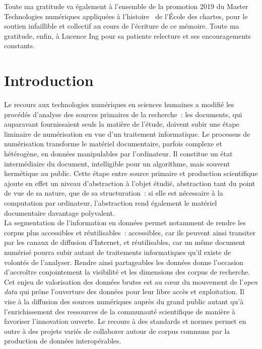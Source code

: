 \documentclass[a4paper,12pt,twoside]{book}
\newcommand{\clearemptydoublepage}{\newpage{\pagestyle{empty}\cleardoublepage}}
\newcommand\mychapter[1]{%
  \chapter*{#1}%
  \markright{\MakeUppercase{#1}}%
}
\newcommand{\eng}{\emph}
\newcommand{\g}[1]{\og#1~\fg}
\begin{document}
	Toute ma gratitude va également à l'ensemble de la promotion 2019 du Master \g{Technologies numériques appliquées à l'histoire} de l'École des chartes, pour le soutien infaillible et collectif au cours de l'écriture de ce mémoire. Toute ma gratitude, enfin, à Lucence Ing pour sa patiente relecture et ses encouragements constants.

\clearemptydoublepage
	
	\printbibliography[keyword={astronomie},title={Histoire de l'astronomie}]
	\printbibliography[keyword={numerique},title={Humanités numériques}]
	\printbibliography[keyword={dataviz},title={Visualisations de données}]
	\printbibliography[keyword={technique},title={Technologies et méthodes}]

\clearemptydoublepage
	
	\mychapter{Introduction}
	
Le recours aux technologies numériques en sciences humaines a modifié les procédés d'analyse des sources primaires de la recherche~: les documents, qui auparavant fournissaient seuls la matière de l'étude, doivent subir une étape liminaire de numérisation en vue d'un traitement informatique. Le processus de numérisation transforme le matériel documentaire, parfois complexe et hétérogène, en données manipulables par l'ordinateur. Il constitue un état intermédiaire du document, intelligible pour un algorithme, mais souvent hermétique au public. Cette étape entre source primaire et production scientifique ajoute en effet un niveau d'abstraction à l'objet étudié, abstraction tant du point de vue de sa nature, que de sa structuration~: si elle est nécessaire à la computation par ordinateur, l'abstraction rend également le matériel documentaire davantage polyvalent.\\

La segmentation de l'information en données permet notamment de rendre les corpus plus accessibles et réutilisables~: accessibles, car ils peuvent ainsi transiter par les canaux de diffusion d'Internet, et réutilisables, car un même document numérisé pourra subir autant de traitements informatiques qu'il existe de volontés de l'analyser. Rendre ainsi partageables les données donne l'occasion d'accroître conjointement la visibilité et les dimensions des corpus de recherche. Cet enjeu de valorisation des données brutes est au cœur du mouvement de l'\eng{open data} qui prône l'ouverture des données pour leur libre accès et exploitation. Il vise à la diffusion des sources numériques auprès du grand public autant qu'à l'enrichissement des ressources de la communauté scientifique de manière à favoriser l'innovation ouverte. Le recours à des standards et normes permet en outre à des projets variés de collaborer autour de corpus communs par la production de données interopérables.\\
\end{document}
